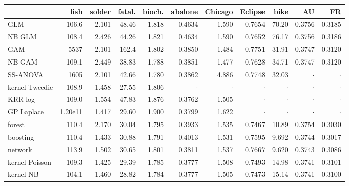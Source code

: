 \begin{tabular}{@{}lrrrrrrrrrr@{}}
\toprule
 & fish & solder & fatal. & bioch. & abalone & Chicago & Eclipse & bike & AU & FR \\
\midrule
GLM & 106.6 & 2.101 & 48.46 & 1.818 & 0.4634 & 1.590 & 0.7654 & 70.20 & 0.3756 & 0.3185 \\
NB GLM & 108.4 & 2.426 & 44.26 & 1.821 & 0.4634 & 1.590 & 0.7652 & 76.17 & 0.3756 & 0.3186 \\
GAM & 5537 & 2.101 & 162.4 & 1.802 & 0.3850 & 1.484 & 0.7751 & 31.91 & 0.3747 & 0.3120 \\
NB GAM & 109.1 & 2.449 & 38.83 & 1.788 & 0.3851 & 1.477 & 0.7628 & 34.71 & 0.3747 & 0.3120 \\
SS-ANOVA & 1605 & 2.101 & 42.66 & 1.780 & 0.3862 & 4.886 & 0.7748 & 32.03 & $\cdot$ & $\cdot$ \\
kernel Tweedie & 108.9 & 1.458 & 27.55 & 1.806 & $\cdot$ & $\cdot$ & $\cdot$ & $\cdot$ & $\cdot$ & $\cdot$ \\
KRR log & 109.0 & 1.554 & 47.83 & 1.876 & 0.3762 & 1.505 & $\cdot$ & $\cdot$ & $\cdot$ & $\cdot$ \\
GP Laplace & 1.20e11 & 1.417 & 29.60 & 1.900 & 0.3799 & 1.622 & $\cdot$ & $\cdot$ & $\cdot$ & $\cdot$ \\
forest & 110.4 & 2.170 & 30.04 & 1.795 & 0.3933 & 1.535 & 0.7467 & 10.89 & 0.3754 & 0.3030 \\
boosting & 110.4 & 1.433 & 30.88 & 1.791 & 0.4013 & 1.531 & 0.7595 & 9.692 & 0.3744 & 0.3017 \\
network & 113.9 & 1.502 & 30.65 & 1.801 & 0.3811 & 1.537 & 0.7667 & 9.620 & 0.3743 & 0.3086 \\
kernel Poisson & 109.3 & 1.425 & 29.39 & 1.785 & 0.3777 & 1.508 & 0.7493 & 14.98 & 0.3741 & 0.3101 \\
kernel NB & 104.1 & 1.460 & 28.82 & 1.784 & 0.3777 & 1.505 & 0.7473 & 15.14 & 0.3741 & 0.3100 \\
\bottomrule
\end{tabular}
